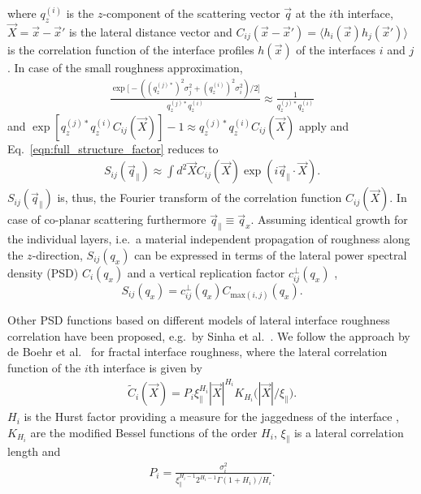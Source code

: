 \documentclass[twocolumn,osajnl,showpacs,superscriptaddress,11pt]{revtex4-1}
\begin{document}
where $q_z^{(i)}$ is the $z$-component of the scattering vector $\vec{q}$ at the $i$th interface, $\vec{X} = \vec{x} - \vec{x}'$ is the lateral distance vector and $C_{ij}(\vec{x}-\vec{x}') = \langle h_i(\vec{x}) h_j(\vec{x}') \rangle$ is the correlation function of the interface profiles $h(\vec{x})$ of the interfaces $i$ and $j$ \cite{PhysRevB.51.5297,PhysRevB.53.6048}. In case of the small roughness approximation, \begin{align}
\frac{\exp \Big[-((q_z^{(j)*})^2 \sigma_j^2 + (q_z^{(i)})^{2} \sigma_i^2)/2\Big]}{q_z^{(j)*} q_z^{(i)}} \approx \frac{1}{q_z^{(j)*} q_z^{(i)}}
\end{align}
and $\exp [q_z^{(j)*} q_z^{(i)} C_{ij}(\vec{X})]-1 \approx q_z^{(j)*} q_z^{(i)} C_{ij}(\vec{X})$ apply and Eq.~\eqref{eqn:full_structure_factor} reduces to
\begin{align}
S_{ij}(\vec{q}_\parallel) \approx \int d^2 \vec{X} C_{ij}(\vec{X}) \exp(i \vec{q}_\parallel \cdot \vec{X}) \text{.} \label{eqn:reduced_structure_factor}
\end{align}
$S_{ij}(\vec{q}_\parallel)$ is, thus, the Fourier transform of the correlation function $C_{ij}(\vec{X})$. In case of co-planar scattering furthermore $\vec{q}_\parallel \equiv \vec{q}_x$.
Assuming identical growth for the individual layers, i.e.~a material independent propagation of roughness along the $z$-direction, $S_{ij}(q_x)$ can be expressed in terms of the lateral power spectral density (PSD) $C_{i}(q_x)$ and a vertical replication factor $c_{ij}^{\perp}(q_x)$ \cite{spiller1993multilayer},
\begin{equation}
	S_{ij}(q_x) = c_{ij}^{\perp}(q_x) C_{\text{max}(i,j)}(q_x)\text{.} \label{eqn:factorized_structure_factor}
\end{equation}

Other PSD functions based on different models of lateral interface roughness correlation have been proposed, e.g.~by Sinha et al.~\cite{PhysRevB.38.2297}. We follow the approach by de Boehr et al.~\cite{deBoerLateralCorrelation,PhysRevB.51.5297} for fractal interface roughness, where the lateral correlation function of the $i$th interface is given by
\begin{align}
\tilde{C}_i(\vec{X}) = P_i \xi_\parallel^{H_i} |\vec{X}|^{H_i} K_{H_i}\Big(|\vec{X}|/\xi_\parallel\Big) \text{.} \label{eqn:lateral_correlation_function}
\end{align}
$H_i$ is the Hurst factor providing a measure for the jaggedness of the interface \cite{PhysRevB.38.2297}, $K_{H_i}$ are the modified Bessel functions of the order $H_i$, $\xi_\parallel$ is a lateral correlation length and
\begin{align}
P_i = \frac{\sigma_i^2}{\xi_\parallel^{H_i-1} 2^{H_i-1} \Gamma(1+H_i)/H_i}\text{.}
\end{align}
\end{document}
